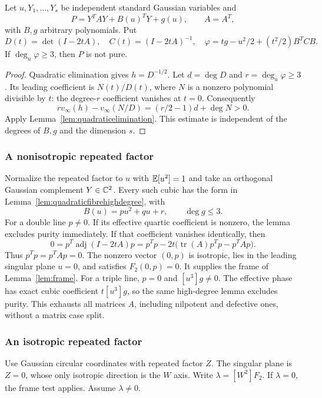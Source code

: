 \begin{lemma}\label{lem:quadraticfibrehighdegree}
Let $u,Y_1,\ldots,Y_s$ be independent standard Gaussian variables
and
\[
 P=Y^TAY+B(u)^TY+g(u),\qquad A=A^T,
\]
with $B,g$ arbitrary polynomials. Put
\[
 D(t)=\det(I-2tA),\quad C(t)=(I-2tA)^{-1},\quad
 \varphi=tg-u^2/2+(t^2/2)B^TCB.
\]
If $\deg_u\varphi\ge3$, then $P$ is not pure.
\end{lemma}
\begin{proof}
Quadratic elimination gives $h=D^{-1/2}$. Let $d=\deg D$ and
$r=\deg_u\varphi\ge3$. Its leading coefficient is $N(t)/D(t)$,
where $N$ is a nonzero polynomial divisible by $t$:
the degree-$r$ coefficient vanishes at $t=0$. Consequently
\[
 r v_\infty(h)-v_\infty(N/D)
     =(r/2-1)d+\deg N>0.
\]
Apply Lemma~\ref{lem:quadraticelimination}. This estimate is
independent of the degrees of $B,g$ and the dimension $s$.
\end{proof}

\subsubsection*{A nonisotropic repeated factor}

Normalize the repeated factor to $u$ with $\mathbb E[u^2]=1$ and take
an orthogonal Gaussian complement $Y\in\mathbb C^2$. Every such cubic
has the form in Lemma~\ref{lem:quadraticfibrehighdegree}, with
\[
 B(u)=p u^2+q u+r,\qquad\deg g\le3.
\]
For a double line $p\ne0$. If its effective quartic coefficient
is nonzero, the lemma excludes purity immediately. If that
coefficient vanishes identically, then
\[
 0=p^T\operatorname{adj}(I-2tA)p
   =p^Tp-2t\bigl(\operatorname{tr}(A)p^Tp-p^TAp\bigr).
\]
Thus $p^Tp=p^TAp=0$. The nonzero vector $(0,p)$ is isotropic,
lies in the leading singular plane $u=0$, and satisfies
$F_2(0,p)=0$. It supplies the frame of Lemma~\ref{lem:frame}.
For a triple line, $p=0$ and $[u^3]g\ne0$. The effective
phase has exact cubic coefficient $t[u^3]g$, so the same
high-degree lemma excludes purity. This exhausts all matrices
$A$, including nilpotent and defective ones, without a matrix
case split.

\subsubsection*{An isotropic repeated factor}

Use Gaussian circular coordinates with repeated factor $Z$.
The singular plane is $Z=0$, whose only isotropic direction is
the $W$ axis. Write $\lambda=[W^2]F_2$. If $\lambda=0$, the
frame test applies. Assume $\lambda\ne0$.

